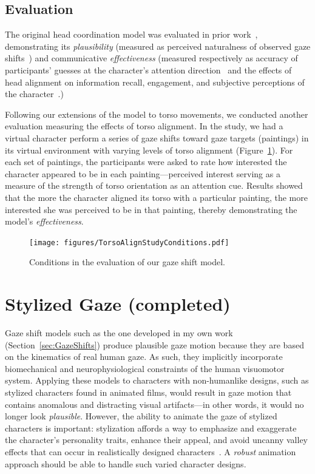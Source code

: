 \subsection{Evaluation}

The original head coordination model was evaluated in prior work~\citep{andrist2012headeye,andrist2012designing}, demonstrating its \emph{plausibility} (measured as perceived naturalness of observed gaze shifts~\citep{andrist2012headeye}) and communicative \emph{effectiveness} (measured respectively as accuracy of participants' guesses at the character's attention direction~\citep{andrist2012headeye} and the effects of head alignment on information recall, engagement, and subjective perceptions of the character~\citep{andrist2012designing}.)

Following our extensions of the model to torso movements, we conducted another evaluation measuring the effects of torso alignment. In the study, we had a virtual character perform a series of gaze shifts toward gaze targets (paintings) in its virtual environment with varying levels of torso alignment (Figure~\ref{fig:TorsoAlignStudyConditions}). For each set of paintings, the participants were asked to rate how interested the character appeared to be in each painting---perceived interest serving as a measure of the strength of torso orientation as an attention cue. Results showed that the more the character aligned its torso with a particular painting, the more interested she was perceived to be in that painting, thereby demonstrating the model's \emph{effectiveness}.

\begin{figure}
\centering
\texttt{[image: figures/TorsoAlignStudyConditions.pdf]}
\caption{Conditions in the evaluation of our gaze shift model.}
\label{fig:TorsoAlignStudyConditions}
\end{figure}

\section{Stylized Gaze (completed)}
\label{sec:StylizedGaze}

Gaze shift models such as the one developed in my own work (Section~\ref{sec:GazeShifts}) produce plausible gaze motion because they are based on the kinematics of real human gaze. As such, they implicitly incorporate biomechanical and neurophysiological constraints of the human visuomotor system. Applying these models to characters with non-humanlike designs, such as stylized characters found in animated films, would result in gaze motion that contains anomalous and distracting visual artifacts---in other words, it would no longer look \emph{plausible}. However, the ability to animate the gaze of stylized characters is important: stylization affords a way to emphasize and exaggerate the character's personality traits, enhance their appeal, and avoid uncanny valley effects that can occur in realistically designed characters~\citep{geller2008overcoming}. A \emph{robust} animation approach should be able to handle such varied character designs.


